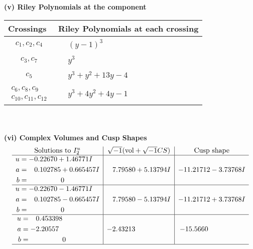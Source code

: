 \documentclass[1p]{elsarticle_modified}
\theoremstyle{definition}
\newcommand{\I}{\sqrt{-1}}
\begin{document}
\flushleft \textbf{(v) Riley Polynomials at the component}\newline \\
\begin{tabular}{m{50pt}|m{274pt}}
Crossings & \hspace{64pt}Riley Polynomials at each crossing \\
\hline $$\begin{aligned}c_{1},c_{2},c_{4}\end{aligned}$$&$\begin{aligned}
&(y-1)^3
\end{aligned}$\\
\hline $$\begin{aligned}c_{3},c_{7}\end{aligned}$$&$\begin{aligned}
&y^3
\end{aligned}$\\
\hline $$\begin{aligned}c_{5}\end{aligned}$$&$\begin{aligned}
&y^3+y^2+13 y-4
\end{aligned}$\\
\hline $$\begin{aligned}c_{6},c_{8},c_{9}\\c_{10},c_{11},c_{12}\end{aligned}$$&$\begin{aligned}
&y^3+4 y^2+4 y-1
\end{aligned}$\\
\hline
\end{tabular}\\~\\
\newpage\flushleft \textbf{(vi) Complex Volumes and Cusp Shapes}
$$\begin{array}{c|c|c}  
\text{Solutions to }I^u_{2}& \I (\text{vol} + \sqrt{-1}CS) & \text{Cusp shape}\\
 \hline 
\begin{aligned}
u &= -0.22670 + 1.46771 I \\
a &= \phantom{-}0.102785 + 0.665457 I \\
b &= \phantom{-0.000000 } 0\end{aligned}
 & \phantom{-}7.79580 + 5.13794 I & -11.21712 - 3.73768 I \\ \hline\begin{aligned}
u &= -0.22670 - 1.46771 I \\
a &= \phantom{-}0.102785 - 0.665457 I \\
b &= \phantom{-0.000000 } 0\end{aligned}
 & \phantom{-}7.79580 - 5.13794 I & -11.21712 + 3.73768 I \\ \hline\begin{aligned}
u &= \phantom{-}0.453398\phantom{ +0.000000I} \\
a &= -2.20557\phantom{ +0.000000I} \\
b &= \phantom{-0.000000 } 0\end{aligned}
 & -2.43213\phantom{ +0.000000I} & -15.5660\phantom{ +0.000000I}\\
 \hline 
 \end{array}$$\newpage\newpage\renewcommand{\arraystretch}{1}
\end{document}

